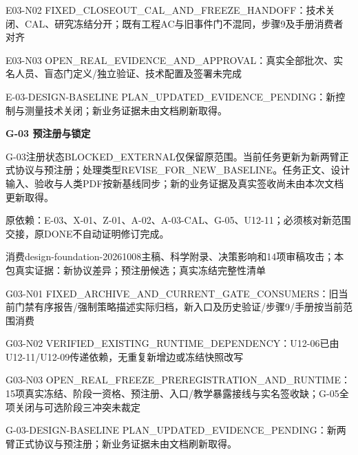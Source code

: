 \documentclass[11pt,a4paper]{article}
\newcommand{\reviewsection}[1]{\par\Needspace{5\baselineskip}\vspace{10pt}\begin{center}{\titlelatin\titlecjk\bfseries\fontsize{14}{20}\selectfont #1}\end{center}}
\begin{document}
E03-\allowbreak{}N02 FIXED\_\allowbreak{}CLOSEOUT\_\allowbreak{}CAL\_\allowbreak{}AND\_\allowbreak{}FREEZE\_\allowbreak{}HANDOFF：技术关闭、CAL、研究冻结分开；既有工程AC与旧事件门不混同，步骤9及手册消费者对齐


E03-\allowbreak{}N03 OPEN\_\allowbreak{}REAL\_\allowbreak{}EVIDENCE\_\allowbreak{}AND\_\allowbreak{}APPROVAL：真实全部批次、实名人员、盲态门定义/\allowbreak{}独立验证、技术配置及签署未完成


E-\allowbreak{}03-\allowbreak{}DESIGN-\allowbreak{}BASELINE PLAN\_\allowbreak{}UPDATED\_\allowbreak{}EVIDENCE\_\allowbreak{}PENDING：新控制与测量技术关闭；新业务证据未由文档刷新取得。


\reviewsection{G-\allowbreak{}03 预注册与锁定}
G-\allowbreak{}03注册状态BLOCKED\_\allowbreak{}EXTERNAL仅保留原范围。当前任务更新为新两臂正式协议与预注册；处理类型REVISE\_\allowbreak{}FOR\_\allowbreak{}NEW\_\allowbreak{}BASELINE。任务正文、设计输入、验收与人类PDF按新基线同步；新的业务证据及真实签收尚未由本次文档更新取得。


原依赖：E-\allowbreak{}03、X-\allowbreak{}01、Z-\allowbreak{}01、A-\allowbreak{}02、A-\allowbreak{}03-\allowbreak{}CAL、G-\allowbreak{}05、U12-\allowbreak{}11；必须核对新范围交接，原DONE不自动证明修订完成。


消费design-\allowbreak{}foundation-\allowbreak{}20261008主稿、科学附录、决策影响和14项审稿攻击；本包真实证据：新协议差异；预注册候选；真实冻结完整性清单


G03-\allowbreak{}N01 FIXED\_\allowbreak{}ARCHIVE\_\allowbreak{}AND\_\allowbreak{}CURRENT\_\allowbreak{}GATE\_\allowbreak{}CONSUMERS：旧当前门禁有序报告/\allowbreak{}强制策略描述实际归档，新入口及历史验证/\allowbreak{}步骤9/\allowbreak{}手册按当前范围消费


G03-\allowbreak{}N02 VERIFIED\_\allowbreak{}EXISTING\_\allowbreak{}RUNTIME\_\allowbreak{}DEPENDENCY：U12-\allowbreak{}06已由U12-\allowbreak{}11/\allowbreak{}U12-\allowbreak{}09传递依赖，无重复新增边或冻结快照改写


G03-\allowbreak{}N03 OPEN\_\allowbreak{}REAL\_\allowbreak{}FREEZE\_\allowbreak{}PREREGISTRATION\_\allowbreak{}AND\_\allowbreak{}RUNTIME：15项真实冻结、阶段一资格、预注册、入口/\allowbreak{}教学暴露接线与实名签收缺；G-\allowbreak{}05全项关闭与可选阶段三冲突未裁定


G-\allowbreak{}03-\allowbreak{}DESIGN-\allowbreak{}BASELINE PLAN\_\allowbreak{}UPDATED\_\allowbreak{}EVIDENCE\_\allowbreak{}PENDING：新两臂正式协议与预注册；新业务证据未由文档刷新取得。
\end{document}
